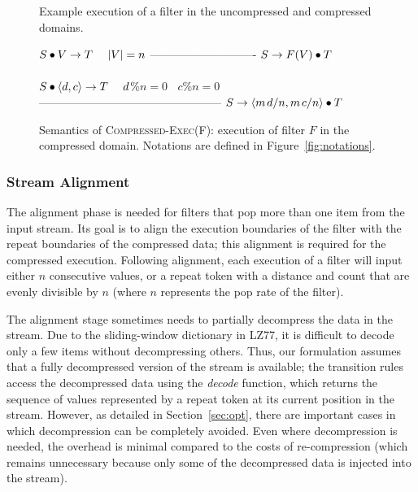 \begin{figure*}[t]
\vspace{-6pt}
\vspace{6pt}
\caption{Example execution of a filter in the uncompressed and
  compressed domains.\protect\label{fig:filter-example}}
\end{figure*}

\begin{figure}[t]
$S \bullet V \rightarrow T~~~~|V|=n$ \skiptopb
---------------------------- \skipbot
$S \rightarrow F(V) \bullet T$
~ \\ ~ \\
$S \bullet \langle d, c\rangle \rightarrow T~~~~d$\%$n=0~~~~c$\%$n=0$ \skiptopb
------------------------------------------------ \skipbot
$S \rightarrow \langle m{\hspace{1.3pt}}d/n, m{\hspace{1.3pt}}c/n\rangle \bullet T$
\caption{Semantics of \textsc{Compressed-Exec(F)}: execution of filter
$F$ in the compressed domain.
Notations are defined in Figure~\ref{fig:notations}.
\protect\label{fig:compressed-exec-rule}}
\end{figure}

\subsubsection{Stream Alignment}

The alignment phase is needed for filters that pop more than one item
from the input stream.  Its goal is to align the execution boundaries
of the filter with the repeat boundaries of the compressed data; this
alignment is required for the compressed execution.  Following
alignment, each execution of a filter will input either $n$
consecutive values, or a repeat token with a distance and count that
are evenly divisible by $n$ (where $n$ represents the pop rate of the
filter).

The alignment stage sometimes needs to partially decompress the data
in the stream.  Due to the sliding-window dictionary in LZ77, it is
difficult to decode only a few items without decompressing others.
Thus, our formulation assumes that a fully decompressed version of the
stream is available; the transition rules access the decompressed data
using the \mbox{\it decode} function, which returns the sequence of
values represented by a repeat token at its current position in the
stream.  However, as detailed in Section~\ref{sec:opt}, there are
important cases in which decompression can be completely avoided.
Even where decompression is needed, the overhead is minimal compared
to the costs of re-compression (which remains unnecessary because only
some of the decompressed data is injected into the stream).

